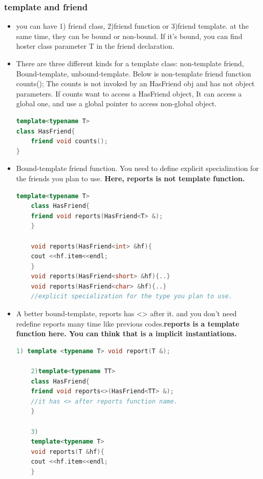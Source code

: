 \documentclass[a4paper,12pt,twoside]{book}
\begin{document}
\subsubsection{template and friend}
\begin{itemize}
	\item you can have 1) friend class, 2)friend function or 3)friend template. at the same time, they can be bound or non-bound. If it's bound, you can find hoster class parameter T in the friend declaration. 
	
	\item  There are three different kinds for a template class: non-template friend,  Bound-template, unbound-template. Below is non-template friend function counts(); The counts is not invoked by an HasFriend obj and has not object parameters.  If counts want to access a HasFriend object, It can access a global one, and use a global pointer to access non-global object.
\begin{lstlisting}[frame=single, language=c++]
template<typename T>
class HasFriend{
	friend void counts();
}
\end{lstlisting}
	
	\item Bound-template friend function. You need to define explicit specialization for the friends you plan to use. \textbf{Here, reports is not template function. }
	
	\begin{lstlisting}[frame=single, language=c++]
	template<typename T>
	class HasFriend{
	friend void reports(HasFriend<T> &);
	}
	
	void reports(HasFriend<int> &hf){
	cout <<hf.item<<endl;
	}
	void reports(HasFriend<short> &hf){..}
	void reports(HasFriend<char> &hf){..}
	//explicit specialization for the type you plan to use.
	\end{lstlisting}
	
	\item A better bound-template, reports has <> after it.  and you don't need redefine reports many time like previous codes.\textbf{reports is a template function here. You can think that is a implicit instantiations. }
	\begin{lstlisting}[frame=single, language=c++]
	1) template <typename T> void report(T &);
	
	2)template<typename TT>
	class HasFriend{
	friend void reports<>(HasFriend<TT> &);
	//it has <> after reports function name.
	}
	
	3)
	template<typename T>
	void reports(T &hf){
	cout <<hf.item<<endl;
	}
	\end{lstlisting}
	

\end{itemize}
\end{document}
